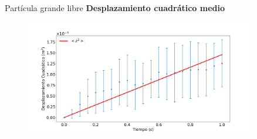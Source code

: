 \begin{frame}{Partícula grande libre}
    \textbf{Desplazamiento cuadrático medio}
    \begin{figure}[H]
        \centering
        \includegraphics[width=0.9\textwidth]{pic/05-results/dcm_graph_and_slope}
        \label{fig:dcm-graph-and-slope}
    \end{figure}
\end{frame}


